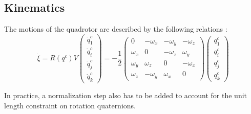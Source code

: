     \subsection{Kinematics}
        The motions of the quadrotor are described by the following relations \citep{Pounds_modellingand}: %
        \begin{subequations}
            \label{eq:observer:kinematicsc}
            \begin{equation}
                \label{eq:observer:position}
                \dot{\xi} = R(q^{c})V
            \end{equation}
            \begin{equation}
                \label{eq:observer:quaternionsc}
                \left(\begin{array}{c}
                    \dot{q}_{1}^{c} \\
                    \dot{q}_{i}^{c} \\
                    \dot{q}_{j}^{c} \\
                    \dot{q}_{k}^{c}
                \end{array}\right) = -\frac{1}{2}\left(\begin{array}{cccc}
                0 & -\omega_{x} & -\omega_{y} & -\omega_{z} \\
                \omega_{x} & 0 & -\omega_{z} & \omega_{y} \\
                \omega_{y} & \omega_{z} & 0 & -\omega_{x} \\
                \omega_{z} & -\omega_{y} & \omega_{x} & 0
                \end{array}\right)\left(\begin{array}{c}
                q_{1}^{c} \\
                q_{i}^{c} \\
                q_{j}^{c} \\
                q_{k}^{c}
                \end{array}\right)
            \end{equation}
        \end{subequations}

        In practice, a normalization step also has to be added to account for
        the unit length constraint on rotation quaternions.


